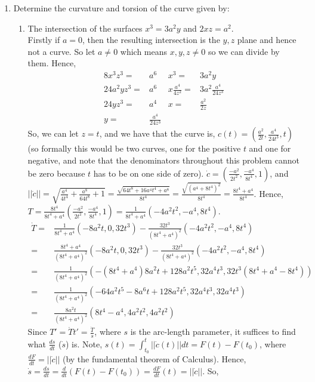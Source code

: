 \documentclass[12pt]{amsart}
\newcommand{\q}[1]{\item #1}
\newcommand{\p}[1]{\item #1}
\begin{document}
\begin{enumerate}
\newpage
\q{Determine the curvature and torsion of the curve given by:
\begin{enumerate}
\p{The intersection of the surfaces $x^3=3a^2y$ and $2xz=a^2$.
\\Firstly if $a=0$, then the resulting intersection is the $y,z$ plane and hence not a curve. So let $a\neq0$ which means $x,y,z\neq0$ so we can divide by them. Hence,
\begin{align*}
	8x^3z^3=&a^6 & x^3=&3a^2y
	\\24a^2yz^3=&a^6 & x\frac{a^4}{4z^2}=&3a^2\frac{a^4}{24z^3}
	\\24yz^3=&a^4 & x=&\frac{a^2}{2z}
	\\y=&\frac{a^4}{24z^3} & &
\end{align*}
So, we can let $z=t$, and we have that the curve is, $c(t)=\left(\frac{a^2}{2t},\frac{a^4}{24t^3},t\right)$ (so formally this would be two curves, one for the positive $t$ and one for negative, and note that the denominators throughout this problem cannot be zero because $t$ has to be on one side of zero). $\dot c=\left(\frac{-a^2}{2t^2},\frac{-a^4}{8t^4},1\right)$, and $||\dot c||=\sqrt{\frac{a^4}{4t^4}+\frac{a^8}{64t^8}+1}=\frac{\sqrt{64t^8+16a^4t^4+a^8}}{8t^4}=\frac{\sqrt{(a^4+8t^4)^2}}{8t^4}=\frac{8t^4+a^4}{8t^4}$. Hence, $T=\frac{8t^4}{8t^4+a^4}\left(\frac{-a^2}{2t^2},\frac{-a^4}{8t^4},1\right)=\frac{1}{8t^4+a^4}\left(-4a^2t^2,-a^4,8t^4\right)$.
\begin{align*}
	\dot T=&\frac{1}{8t^4+a^4}\left(-8a^2t,0,32t^3\right)-\frac{32t^3}{(8t^4+a^4)^2}\left(-4a^2t^2,-a^4,8t^4\right)
	\\=&\frac{8t^4+a^4}{(8t^4+a^4)^2}\left(-8a^2t,0,32t^3\right)-\frac{32t^3}{(8t^4+a^4)^2}\left(-4a^2t^2,-a^4,8t^4\right)
	\\=&\frac{1}{(8t^4+a^4)^2}\left(-(8t^4+a^4)8a^2t+128a^2t^5,32a^4t^3,32t^3(8t^4+a^4-8t^4)\right)
	\\=&\frac{1}{(8t^4+a^4)^2}\left(-64a^2t^5-8a^6t+128a^2t^5,32a^4t^3,32a^4t^3\right)
	\\=&\frac{8a^2t}{(8t^4+a^4)^2}\left(8t^4-a^4,4a^2t^2,4a^2t^2\right)
\end{align*}
Since $T'=\dot Tt'=\frac{\dot T}{\dot s}$, where $s$ is the arc-length parameter, it suffices to find what $\frac{ds}{dt}$ ($\dot s$) is. Note, $s(t)=\int_{t_0}^t||\dot c(t)||dt=F(t)-F(t_0)$, where $\frac{dF}{dt}=||\dot c||$ (by the fundamental theorem of Calculus). Hence, $\dot s=\frac{ds}{dt}=\frac{d}{dt}(F(t)-F(t_0))=\frac{dF}{dt}(t)=||\dot c||$. So, 
\begin{align*}

\end{align*}}
\end{enumerate}}
\end{enumerate}
\end{document}
